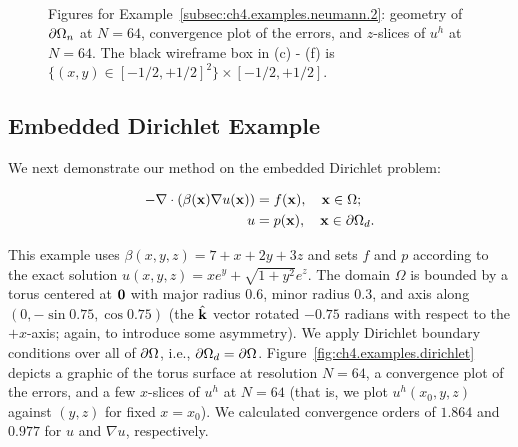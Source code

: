 \setlength{\figureheighti}{0.40\columnwidth}
\setlength{\figurewidthii}{0.24\columnwidth}
\begin{figure}[htbp]
\begin{center}
 \\
\caption{Figures for Example~\ref{subsec:ch4.examples.neumann.2}: geometry of $\partial\Omega_n$ at $N = 64$, convergence plot of the errors, and $z$-slices of $u^h$ at $N = 64$. The black wireframe box in (c) - (f) is $\{(x,y) \in [-1/2,+1/2]^2\} \times [-1/2,+1/2]$.}
\label{fig:ch4.examples.neumann.2}
\end{center}
\end{figure}

\subsection{Embedded Dirichlet Example} \label{subsec:ch4.example.dirichlet}

We next demonstrate our method on the embedded Dirichlet problem:

\begin{align*}
-\nabla \cdot \left( \beta(\mathbf{x}) \nabla u(\mathbf{x}) \right) & = f(\mathbf{x}), \quad \mathbf{x} \in \Omega; \\
u & = p(\mathbf{x}), \quad \mathbf{x} \in \partial\Omega_d.
\end{align*}

This example uses $\beta(x,y,z) = 7 + x + 2y + 3z$ and sets $f$ and $p$ according to the exact solution $u(x,y,z) = x e^y + \sqrt{1 + y^2} e^z$. The domain $\Omega$ is bounded by a torus centered at $\mathbf{0}$ with major radius $0.6$, minor radius $0.3$, and axis along $(0, -\sin 0.75, \cos 0.75)$ (the $\hat{\mathbf{k}}$ vector rotated $-0.75$ radians with respect to the $+x$-axis; again, to introduce some asymmetry). We apply Dirichlet boundary conditions over all of $\partial\Omega$, i.e., $\partial\Omega_d = \partial\Omega$. Figure~\ref{fig:ch4.examples.dirichlet} depicts a graphic of the torus surface at resolution $N = 64$, a convergence plot of the errors, and a few $x$-slices of $u^h$ at $N = 64$ (that is, we plot $u^h(x_0,y,z)$ against $(y,z)$ for fixed $x = x_0$). We calculated convergence orders of $1.864$ and $0.977$ for $u$ and $\nabla u$, respectively.


